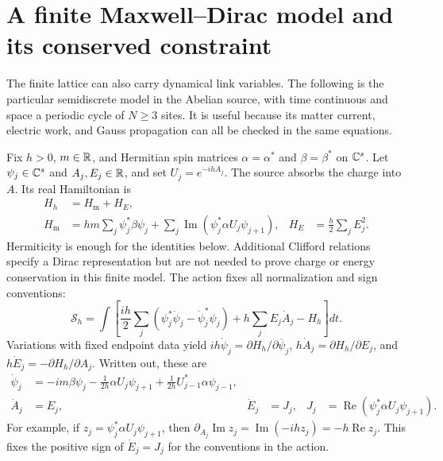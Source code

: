 \section{A finite Maxwell--Dirac model and its conserved constraint}\label{g:maxwell-dirac}

The finite lattice can also carry dynamical link variables. The following is the particular semidiscrete model in the Abelian source, with time continuous and space a periodic cycle of $N\ge3$ sites. It is useful because its matter current, electric work, and Gauss propagation can all be checked in the same equations.

Fix $h>0$, $m\in\mathbb R$, and Hermitian spin matrices $\alpha=\alpha^*$ and $\beta=\beta^*$ on $\mathbb C^s$. Let $\psi_j\in\mathbb C^s$ and $A_j,E_j\in\mathbb R$, and set $U_j=e^{-ihA_j}$. The source absorbs the charge into $A$. Its real Hamiltonian is
\begin{align}
 H_h&=H_{\mathrm m}+H_E,\label{g:hamiltonian}\\
 H_{\mathrm m}
 &=hm\sum_j\psi_j^*\beta\psi_j
   +\sum_j\operatorname{Im}(\psi_j^*\alpha U_j\psi_{j+1}),
 &H_E&=\frac h2\sum_jE_j^2.\label{g:hamiltonian-parts}
\end{align}
Hermiticity is enough for the identities below. Additional Clifford relations specify a Dirac representation but are not needed to prove charge or energy conservation in this finite model. The action fixes all normalization and sign conventions:
\begin{equation}\label{g:action}
 \mathcal S_h=\int\left[
 \frac{ih}{2}\sum_j(\psi_j^*\dot\psi_j-\dot\psi_j^*\psi_j)
 +h\sum_jE_j\dot A_j-H_h\right]dt.
\end{equation}
Variations with fixed endpoint data yield $ih\dot\psi_j=\partial H_h/\partial\overline\psi_j$, $h\dot A_j=\partial H_h/\partial E_j$, and $h\dot E_j=-\partial H_h/\partial A_j$. Written out, these are
\begin{align}
 \dot\psi_j&=-im\beta\psi_j
 -\frac1{2h}\alpha U_j\psi_{j+1}
 +\frac1{2h}U_{j-1}^*\alpha\psi_{j-1},\label{g:matter-ode}\\
 \dot A_j&=E_j,
 &\dot E_j&=J_j,
 &J_j&=\operatorname{Re}(\psi_j^*\alpha U_j\psi_{j+1}).
 \label{g:field-ode}
\end{align}
For example, if $z_j=\psi_j^*\alpha U_j\psi_{j+1}$, then
$\partial_{A_j}\operatorname{Im}z_j
=\operatorname{Im}(-ihz_j)=-h\operatorname{Re}z_j$.
This fixes the positive sign of $\dot E_j=J_j$ for the conventions in the action.

